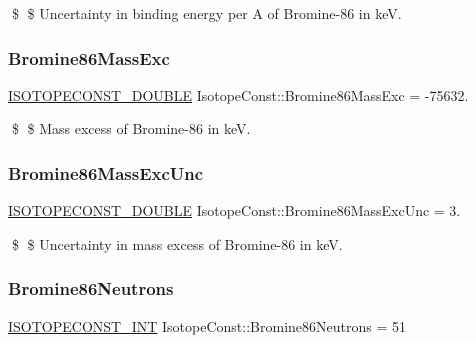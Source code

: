 \$ \$ Uncertainty in binding energy per A of Bromine-\/86 in keV. \mbox{\label{group___isotope_const-_bromine-_br86_ga52a89187d9c12186da47cc46b6f839e4}} 
\subsubsection{\texorpdfstring{Bromine86\+Mass\+Exc}{Bromine86MassExc}}
{\footnotesize\ttfamily \mbox{\hyperlink{group___isotope_const-_macros_ga8f45a7272ce02c0b4c65c44636ed719a}{I\+S\+O\+T\+O\+P\+E\+C\+O\+N\+S\+T\+\_\+\+D\+O\+U\+B\+LE}} Isotope\+Const\+::\+Bromine86\+Mass\+Exc = -\/75632.}

\$ \$ Mass excess of Bromine-\/86 in keV. \mbox{\label{group___isotope_const-_bromine-_br86_ga29175a2199fb46e021d1b0687a711500}} 
\subsubsection{\texorpdfstring{Bromine86\+Mass\+Exc\+Unc}{Bromine86MassExcUnc}}
{\footnotesize\ttfamily \mbox{\hyperlink{group___isotope_const-_macros_ga8f45a7272ce02c0b4c65c44636ed719a}{I\+S\+O\+T\+O\+P\+E\+C\+O\+N\+S\+T\+\_\+\+D\+O\+U\+B\+LE}} Isotope\+Const\+::\+Bromine86\+Mass\+Exc\+Unc = 3.}

\$ \$ Uncertainty in mass excess of Bromine-\/86 in keV. \mbox{\label{group___isotope_const-_bromine-_br86_gad9eb59cf3d3d80dbf95bb31a09ee368a}} 
\subsubsection{\texorpdfstring{Bromine86\+Neutrons}{Bromine86Neutrons}}
{\footnotesize\ttfamily \mbox{\hyperlink{group___isotope_const-_macros_ga5f18360b3e99483a35c32d789e62621c}{I\+S\+O\+T\+O\+P\+E\+C\+O\+N\+S\+T\+\_\+\+I\+NT}} Isotope\+Const\+::\+Bromine86\+Neutrons = 51}

